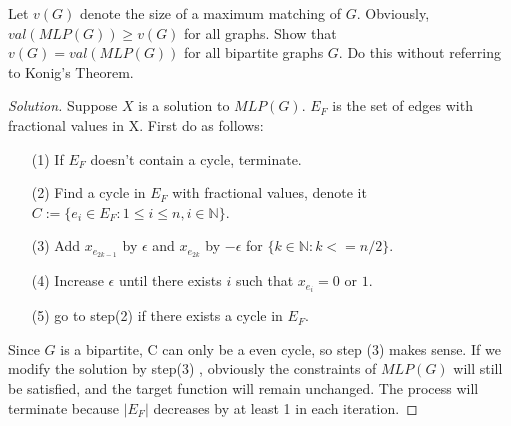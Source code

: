 



    \maketitle

    \begin{thm}{}{}
        Let $v(G)$ denote the size of a maximum matching of $G$.
        Obviously, $val(MLP(G))\ge v(G)$ for all graphs.
        Show that $v(G)=val(MLP(G))$ for all bipartite graphs $G$.
        Do this without referring to Konig's Theorem.
    \end{thm}
    \begin{proof}[Solution]
        Suppose $X$ is a solution to $MLP(G)$.
        $E_F$ is the set of edges with fractional values in X.
        First do as follows:
        \begin{itemize}
            \item[(1)] If $E_F$ doesn't contain a cycle, terminate.
            \item[(2)] Find a cycle in $E_F$ with fractional values, denote it $C:=\{e_i\in E_F :1\le i \le n,i\in\mathbb{N}\}$.
            \item[(3)] Add $x_{e_{2k-1}}$ by $\epsilon$ and $x_{e_{2k}}$ by $-\epsilon$ for $\{k\in \mathbb{N}:k<=n/2\}$.
            \item[(4)] Increase $\epsilon$ until there exists $i$ such that $x_{e_i}=0 \text{ or } 1$.
            \item[(5)] go to step(2) if there exists a cycle in $E_F$.
        \end{itemize}
        Since $G$ is a bipartite, C can only be a even cycle, so step (3) makes sense.
        If we modify the solution by step(3) , obviously the constraints of $MLP(G)$ will still be satisfied, and the target function will remain unchanged.
        The process will terminate because $|E_F|$ decreases by at least 1 in each iteration.


\end{proof}
